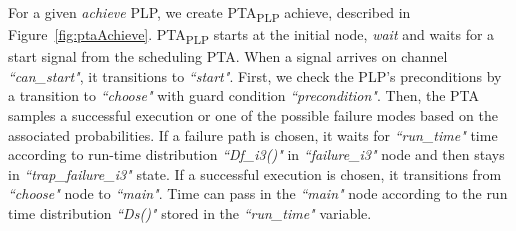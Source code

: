 \documentclass[letterpaper]{article}
\newcommand\rNote[1]{\todo[inline, author=Ronen, color=yellow]{#1}}
\newcommand\aNote[1]{\todo[inline, author=Alex, color=GreenYellow]{#1}}
\newcommand{\frameImage}[4]{
\begin{figure}[H]
  \centerline{
    \fcolorbox{frameColor}{white}{
        \texttt{[image: \#1]} } }
    \caption{#4}
    \label{fig:#1}
\end{figure}
}
\begin{document}





For a given \textit{achieve} PLP, we create PTA\textsubscript{PLP} achieve, described in Figure~\ref{fig:ptaAchieve}.
PTA\textsubscript{PLP} starts at the initial node, \textit{wait} and
waits for a start signal from the scheduling PTA. When a signal arrives on channel \textit{``can\_start"},
it transitions to \textit{``start"}.
First, we check the PLP's preconditions by a transition  to \textit{``choose"} with guard condition \textit{``precondition"}. Then,
the PTA samples a successful execution or one of the possible failure modes based on the associated probabilities.
If a failure path is chosen, it waits for \textit{``run\_time"} time according to run-time distribution \textit{``Df\_i3()"} in \textit{``failure\_i3"} node and then stays in \textit{``trap\_failure\_i3"} state. If a successful  execution is chosen, it transitions from \textit{``choose"} node to \textit{``main"}.  Time can pass in the \textit{``main"} node according to the run time distribution \textit{``Ds()"} stored in the \textit{``run\_time"} variable.
\end{document}
